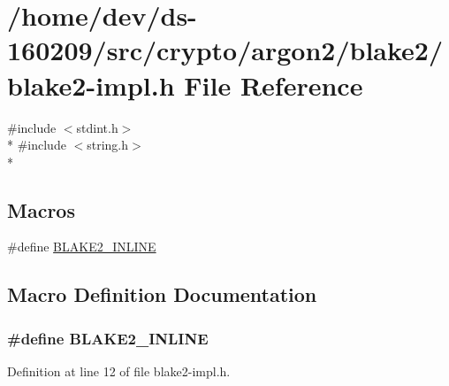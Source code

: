 \hypertarget{blake2-impl_8h}{}\section{/home/dev/ds-\/160209/src/crypto/argon2/blake2/blake2-\/impl.h File Reference}
\label{blake2-impl_8h}
{\ttfamily \#include $<$stdint.\+h$>$}\\*
{\ttfamily \#include $<$string.\+h$>$}\\*
\subsection*{Macros}
\begin{DoxyCompactItemize}
\item 
\#define \hyperlink{blake2-impl_8h_aa47358e2e39f403db8cddffec65337f7}{B\+L\+A\+K\+E2\+\_\+\+I\+N\+L\+I\+N\+E}
\end{DoxyCompactItemize}


\subsection{Macro Definition Documentation}
\hypertarget{blake2-impl_8h_aa47358e2e39f403db8cddffec65337f7}{}
\subsubsection[{B\+L\+A\+K\+E2\+\_\+\+I\+N\+L\+I\+N\+E}]{\setlength{\rightskip}{0pt plus 5cm}\#define B\+L\+A\+K\+E2\+\_\+\+I\+N\+L\+I\+N\+E}\label{blake2-impl_8h_aa47358e2e39f403db8cddffec65337f7}


Definition at line 12 of file blake2-\/impl.\+h.

